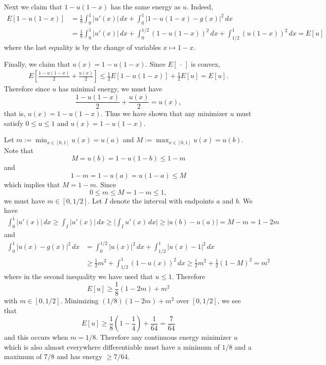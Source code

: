Next we claim that $1 - u(1 -x)$ has the same energy as $u$. Indeed,
\begin{align*}
E[1 - u(1 - x)] &= \frac{1}{8}\int_{0}^{1}|u'(x)|\, dx + \int_{0}^{1}|1 - u(1 - x) - g(x)|^{2}\, dx\\
& = \frac{1}{8}\int_{0}^{1}|u'(x)|\, dx + \int_{0}^{1/2}(1 - u(1 - x))^{2}\, dx + \int_{1/2}^{1}(u(1 - x))^{2}\, dx = E[u]
\end{align*}
where the last equality is by the change of variables $x \mapsto 1 - x$.

Finally, we claim that $u(x) = 1 - u(1 - x)$. Since $E[\,\cdot\,]$ is convex,
\begin{align*}
E[\frac{1 - u(1 - x)}{2} + \frac{u(x)}{2}] \leq \frac{1}{2}E[1 - u(1- x)] + \frac{1}{2}E[u] = E[u].
\end{align*}
Therefore since $u$ has minimal energy, we must have
$$\frac{1 - u(1 - x)}{2} + \frac{u(x)}{2} = u(x),$$
that is, $u(x) = 1 - u(1 - x)$.
Thus we have shown that any minimizer $u$ must satisfy $0 \leq u \leq 1$ and $u(x) = 1 - u(1 - x)$.

Let $m := \min_{x \in [0, 1]}u(x) = u(a)$ and $M := \max_{x \in [0, 1]}u(x) = u(b)$.
Note that
$$M = u(b) = 1 - u(1 - b) \leq 1 - m$$
and
$$1 - m = 1 - u(a) = u(1 - a) \leq M$$
which implies that $M = 1 - m$. Since
$$0 \leq m \leq M = 1 -m \leq 1,$$ we must have $m \in [0, 1/2]$.
Let $I$ denote the interval with endpoints $a$ and $b$. We have
\begin{align*}
\int_{0}^{1}|u'(x)|\, dx \geq \int_{I}|u'(x)|\, dx  \geq \bigg|\int_{I}u'(x)\, dx\bigg| \geq |u(b) - u(a)| = M - m = 1 - 2m
\end{align*}
and
\begin{align*}
\int_{0}^{1}|u(x) - g(x)|^{2}\, dx &= \int_{0}^{1/2}|u(x)|^{2}\, dx + \int_{1/2}^{1}|u(x) - 1|^{2}\, dx\\
& \geq \frac{1}{2}m^{2} + \int_{1/2}^{1}(1 - u(x))^{2}\, dx \geq \frac{1}{2}m^{2} + \frac{1}{2}(1 - M)^{2} = m^{2}
\end{align*}
where in the second inequality we have used that $u \leq 1$.
Therefore
$$E[u] \geq \frac{1}{8}(1 - 2m) + m^{2}$$
with $m\in [0, 1/2]$. Minimizing $(1/8)(1 - 2m) + m^{2}$ over $[0, 1/2]$, we see that $$E[u] \geq \frac{1}{8}(1 - \frac{1}{4}) + \frac{1}{64} = \frac{7}{64}$$
and this occurs when $m = 1/8$. Therefore any continuous energy minimizer $u$ which is also almost everywhere differentiable must have a minimum of $1/8$ and a maximum of $7/8$ and
has energy $\geq 7/64$.

